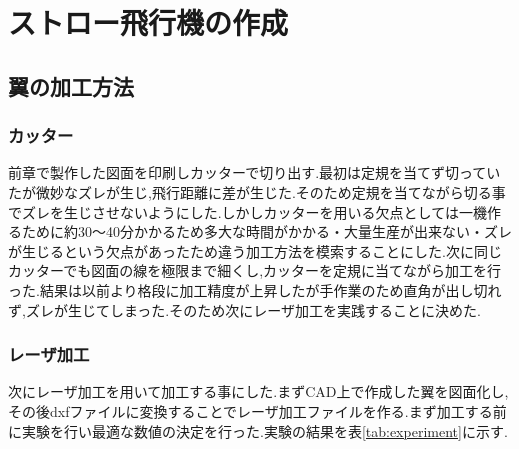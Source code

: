 \chapter{ストロー飛行機の作成}



\section{翼の加工方法}
\subsection{カッター}
前章で製作した図面を印刷しカッターで切り出す.最初は定規を当てず切っていたが微妙なズレが生じ,飛行距離に差が生じた.そのため定規を当てながら切る事でズレを生じさせないようにした.しかしカッターを用いる欠点としては一機作るために約30～40分かかるため多大な時間がかかる・大量生産が出来ない・ズレが生じるという欠点があったため違う加工方法を模索することにした.次に同じカッターでも図面の線を極限まで細くし,カッターを定規に当てながら加工を行った.結果は以前より格段に加工精度が上昇したが手作業のため直角が出し切れず,ズレが生じてしまった.そのため次にレーザ加工を実践することに決めた.

\subsection{レーザ加工}
次にレーザ加工を用いて加工する事にした.まずCAD上で作成した翼を図面化し,その後dxfファイルに変換することでレーザ加工ファイルを作る.まず加工する前に実験を行い最適な数値の決定を行った.実験の結果を表\ref{tab:experiment}に示す.

